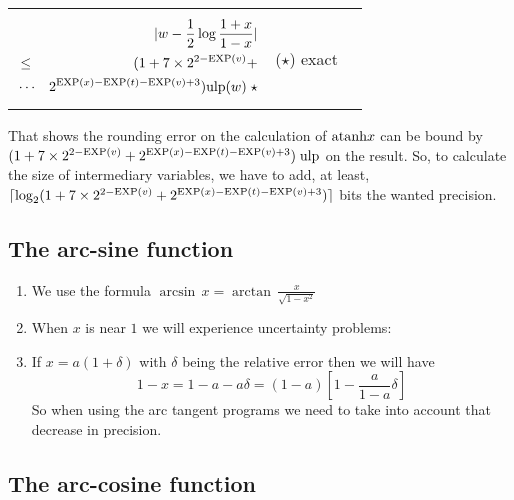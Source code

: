 \documentclass[12pt]{amsart}
\def\n{\textnormal}
\def\ulp{{\rm ulp}}
\def\Exp{{\rm EXP}}
\begin{document}
\begin{center}
\begin{tabular}{l l l}
\begin{minipage}{7.5cm}
\begin{eqnarray}\nonumber
  &&|w-\frac{1}{2}\log{\frac{1+x}{1-x}}| \\\nonumber
  &       \leq& (1+7 \times 2^{2-\Exp(v)} + \\\nonumber
  &       \cdots&  2^{\Exp(x)-\Exp(t)-\Exp(v)+3}) \ulp(w) \;\star
\end{eqnarray}


\end{minipage} &
\begin{minipage}{6cm}

($\star$) exact


\end{minipage}
\end{tabular}
\end{center}

That shows the rounding error on the calculation of $\n{atanh} x$ can
be bound by $ (1+7 \times 2^{2-\Exp(v)} +
2^{\Exp(x)-\Exp(t)-\Exp(v)+3}) \; \ulp$ on the result. So, to
calculate the size of intermediary variables, we have to add, at
least, $\lceil \log_2 (1+7 \times 2^{2-\Exp(v)} +
2^{\Exp(x)-\Exp(t)-\Exp(v)+3}) \rceil$ bits the wanted precision.

\subsection{The arc-sine function}

\begin{enumerate}
\item We use the formula $\arcsin\,x=\arctan\,\frac{x}{\sqrt{1-x^2}}$
\item When $x$ is near $1$ we will experience uncertainty problems:
\item If $x=a(1+\delta)$ with $\delta$ being the relative error then we will have
\begin{equation*}
1-x=1-a-a\delta=(1-a)[1-\frac{a}{1-a}\delta]
\end{equation*}
So when using the arc tangent programs we need to take into account that decrease in precision.
\end{enumerate}

\subsection{The arc-cosine function} %
\end{document}
